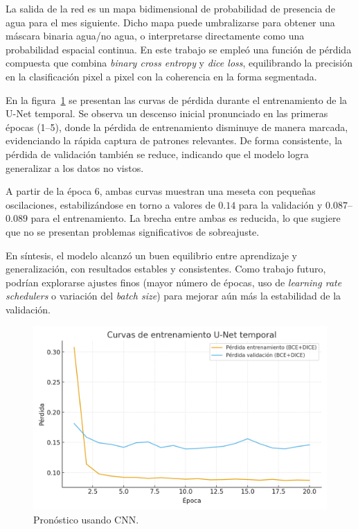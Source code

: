 La salida de la red es un mapa bidimensional de probabilidad de presencia de agua para el mes siguiente. Dicho mapa puede umbralizarse para obtener una máscara binaria agua/no agua, o interpretarse directamente como una probabilidad espacial continua. En este trabajo se empleó una función de pérdida compuesta que combina \emph{binary cross entropy} y \emph{dice loss}, equilibrando la precisión en la clasificación pixel a pixel con la coherencia en la forma segmentada.

En la figura~\ref{fig:curva_unet} se presentan las curvas de pérdida durante el entrenamiento de la U-Net temporal. Se observa un descenso inicial pronunciado en las primeras épocas (1--5), donde la pérdida de entrenamiento disminuye de manera marcada, evidenciando la rápida captura de patrones relevantes. De forma consistente, la pérdida de validación también se reduce, indicando que el modelo logra generalizar a los datos no vistos.

A partir de la época 6, ambas curvas muestran una meseta con pequeñas oscilaciones, estabilizándose en torno a valores de $0.14$ para la validación y $0.087$--$0.089$ para el entrenamiento. La brecha entre ambas es reducida, lo que sugiere que no se presentan problemas significativos de sobreajuste. 

En síntesis, el modelo alcanzó un buen equilibrio entre aprendizaje y generalización, con resultados estables y consistentes. Como trabajo futuro, podrían explorarse ajustes finos (mayor número de épocas, uso de \emph{learning rate schedulers} o variación del \emph{batch size}) para mejorar aún más la estabilidad de la validación.

\begin{figure}[H]
    \centering
    \includegraphics[scale=0.50]{Figures/curva_unet.png}
    \caption{Pronóstico usando CNN.}
    \label{fig:curva_unet}
\end{figure}


